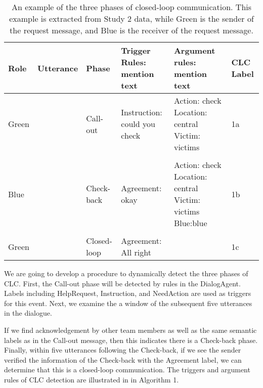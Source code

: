 \begin{table}
    \footnotesize
    \centering
    \begin{tabularx}{6in}{lXlp{1.2in}p{1in}p{0.4in}}
        \toprule
        Role  & Utterance         & Phase       & Trigger Rules: mention text  & Argument rules: mention text                                                         & CLC Label\\\midrule
        Green & \utteranceone{}   & Call-out    & Instruction: could you check & Action: check \newline Location: central \newline Victim: victims                    & 1a\\\\
        Blue  & \utterancetwo{}   & Check-back  & Agreement: okay              & Action: check \newline Location: central \newline Victim: victims \newline Blue:blue & 1b\\\\
        Green & \utterancethree{} & Closed-loop & Agreement: All right         &                                                                                      & 1c\\
        \bottomrule
    \end{tabularx}
    \caption{%
        An example of the three phases of closed-loop communication. This
        example is extracted from Study 2 data, while Green is the sender of the
        request message, and Blue is the receiver of the request message.
    }
    \label{tab:clc-three-phases}
\end{table}

We are going to develop a procedure to dynamically detect the three phases of
CLC. First, the Call-out phase will be detected by rules in the DialogAgent.
Labels including HelpRequest, Instruction, and NeedAction are used as
triggers for this event. Next, we examine the a window of the subsequent five
utterances in the dialogue.

If we find acknowledgement by other team members as well as the same
semantic labels as in the Call-out message, then this indicates there is a
Check-back phase. Finally, within five utterances following the Check-back, if
we see the sender verified the information of the Check-back with the Agreement
label, we can determine that this is a closed-loop communication. The triggers
and argument rules of CLC detection are illustrated in
in Algorithm 1.


